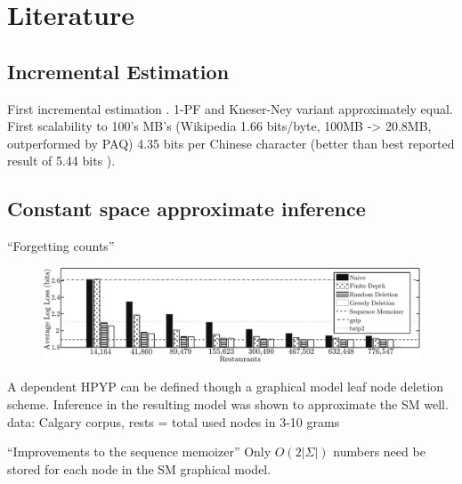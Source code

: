 \documentclass[16pt]{beamer}
\begin{document}
\section{Literature}
\subsection{Incremental Estimation}
\begin{frame}[t]{}
First incremental estimation \citet{Gasthaus2010}.  1-PF and Kneser-Ney variant approximately equal.
First scalability to 100's MB's (Wikipedia 1.66 bits/byte, 100MB -> 20.8MB, outperformed by PAQ)
4.35 bits per Chinese character (better than best reported result of 5.44 bits \cite{Wu2007}).
\end{frame}

\subsection{Constant space approximate inference}
\begin{frame}[t]{}
\begin{block}{``Forgetting counts'' \citet{Bartlett2010}}
\begin{figure}[htbp]
\begin{center}
\includegraphics[width=\textwidth]{results_calgary_corpus.pdf}
\end{center}
\end{figure}
A dependent HPYP can be defined though a graphical model leaf node deletion scheme.  Inference in the resulting model was shown to approximate the SM well.  \tiny{data: Calgary corpus, rests = total used nodes in 3-10 grams}
\end{block}
\begin{block}{``Improvements to the sequence memoizer'' \citet{Gasthaus2011}}
Only $O(2|\Sigma|)$ numbers need be stored for each node in the SM graphical model.
\end{block}

\end{frame}
\end{document}

